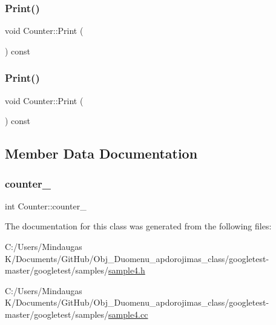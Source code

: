\mbox{\label{class_counter_a80092ec2a0deea0870b2e9f8ad0906bd}} 
\subsubsection{\texorpdfstring{Print()}{Print()}\hspace{0.1cm}{\footnotesize\ttfamily [2/3]}}
{\footnotesize\ttfamily void Counter\+::\+Print (\begin{DoxyParamCaption}{ }\end{DoxyParamCaption}) const}

\mbox{\label{class_counter_a80092ec2a0deea0870b2e9f8ad0906bd}} 
\subsubsection{\texorpdfstring{Print()}{Print()}\hspace{0.1cm}{\footnotesize\ttfamily [3/3]}}
{\footnotesize\ttfamily void Counter\+::\+Print (\begin{DoxyParamCaption}{ }\end{DoxyParamCaption}) const}



\subsection{Member Data Documentation}
\mbox{\label{class_counter_abdef0bf73f0a68177863c42c6eba2fc0}} 
\subsubsection{\texorpdfstring{counter\_}{counter\_}}
{\footnotesize\ttfamily int Counter\+::counter\+\_\+\hspace{0.3cm}{\ttfamily [private]}}



The documentation for this class was generated from the following files\+:\begin{DoxyCompactItemize}
\item 
C\+:/\+Users/\+Mindaugas K/\+Documents/\+Git\+Hub/\+Obj\+\_\+\+Duomenu\+\_\+apdorojimas\+\_\+class/googletest-\/master/googletest/samples/\mbox{\hyperlink{googletest-master_2googletest_2samples_2sample4_8h}{sample4.\+h}}\item 
C\+:/\+Users/\+Mindaugas K/\+Documents/\+Git\+Hub/\+Obj\+\_\+\+Duomenu\+\_\+apdorojimas\+\_\+class/googletest-\/master/googletest/samples/\mbox{\hyperlink{googletest-master_2googletest_2samples_2sample4_8cc}{sample4.\+cc}}\end{DoxyCompactItemize}
